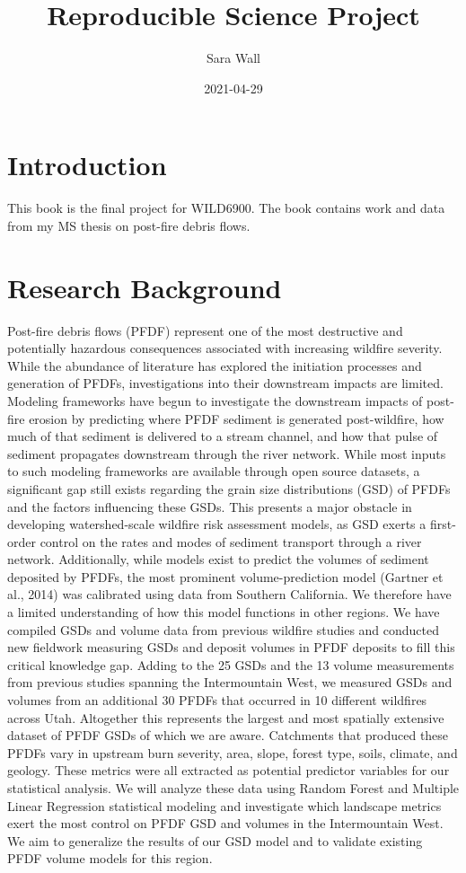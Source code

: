 \documentclass[
]{book}
\title{Reproducible Science Project}
\author{Sara Wall}
\date{2021-04-29}
\begin{document}
\maketitle

{
\setcounter{tocdepth}{1}
\tableofcontents
}
\hypertarget{introduction}{%
\chapter{Introduction}\label{introduction}}

This book is the final project for WILD6900. The book contains work and data from my MS thesis on post-fire debris flows.

\hypertarget{research-background}{%
\chapter{Research Background}\label{research-background}}

Post-fire debris flows (PFDF) represent one of the most destructive and potentially hazardous consequences associated with increasing wildfire severity. While the abundance of literature has explored the initiation processes and generation of PFDFs, investigations into their downstream impacts are limited. Modeling frameworks have begun to investigate the downstream impacts of post-fire erosion by predicting where PFDF sediment is generated post-wildfire, how much of that sediment is delivered to a stream channel, and how that pulse of sediment propagates downstream through the river network. While most inputs to such modeling frameworks are available through open source datasets, a significant gap still exists regarding the grain size distributions (GSD) of PFDFs and the factors influencing these GSDs. This presents a major obstacle in developing watershed-scale wildfire risk assessment models, as GSD exerts a first-order control on the rates and modes of sediment transport through a river network. Additionally, while models exist to predict the volumes of sediment deposited by PFDFs, the most prominent volume-prediction model (Gartner et al., 2014) was calibrated using data from Southern California. We therefore have a limited understanding of how this model functions in other regions. We have compiled GSDs and volume data from previous wildfire studies and conducted new fieldwork measuring GSDs and deposit volumes in PFDF deposits to fill this critical knowledge gap. Adding to the 25 GSDs and the 13 volume measurements from previous studies spanning the Intermountain West, we measured GSDs and volumes from an additional 30 PFDFs that occurred in 10 different wildfires across Utah. Altogether this represents the largest and most spatially extensive dataset of PFDF GSDs of which we are aware. Catchments that produced these PFDFs vary in upstream burn severity, area, slope, forest type, soils, climate, and geology. These metrics were all extracted as potential predictor variables for our statistical analysis. We will analyze these data using Random Forest and Multiple Linear Regression statistical modeling and investigate which landscape metrics exert the most control on PFDF GSD and volumes in the Intermountain West. We aim to generalize the results of our GSD model and to validate existing PFDF volume models for this region.
\end{document}
